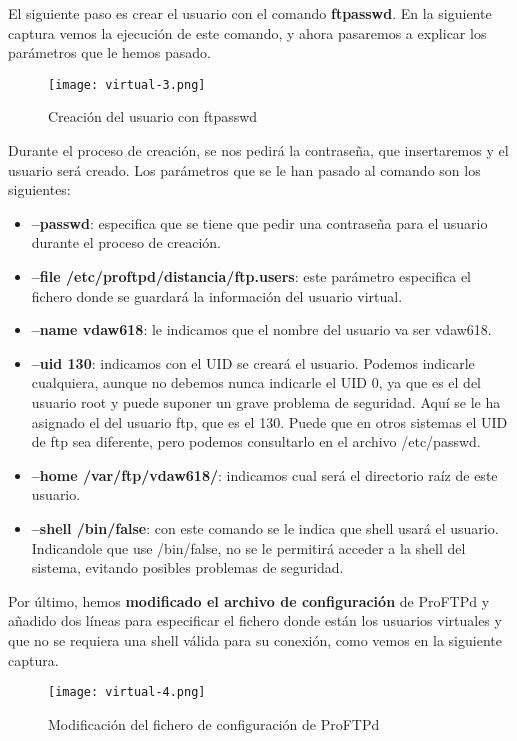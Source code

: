 El siguiente paso es crear el usuario con el comando \textbf{ftpasswd}. En la siguiente captura vemos la ejecución de este comando, y ahora pasaremos a explicar los parámetros que le hemos pasado.

\begin{figure}[H]
    \centering
    \texttt{[image: virtual-3.png]}
    \caption{Creación del usuario con ftpasswd}
\end{figure}

Durante el proceso de creación, se nos pedirá la contraseña, que insertaremos y el usuario será creado. Los parámetros que se le han pasado al comando son los siguientes:

\begin{itemize}
    \item \textbf{--passwd}: especifica que se tiene que pedir una contraseña para el usuario durante el proceso de creación.
    \item \textbf{--file /etc/proftpd/distancia/ftp.users}: este parámetro especifica el fichero donde se guardará la información del usuario virtual.
    \item \textbf{--name vdaw618}: le indicamos que el nombre del usuario va ser vdaw618.
    \item \textbf{--uid 130}: indicamos con el UID se creará el usuario. Podemos indicarle cualquiera, aunque no debemos nunca indicarle el UID 0, ya que es el del usuario root y puede suponer un grave problema de seguridad. Aquí se le ha asignado el del usuario ftp, que es el 130. Puede que en otros sistemas el UID de ftp sea diferente, pero podemos consultarlo en el archivo /etc/passwd.
    \item \textbf{--home /var/ftp/vdaw618/}: indicamos cual será el directorio raíz de este usuario.
    \item \textbf{--shell /bin/false}: con este comando se le indica que shell usará el usuario. Indicandole que use /bin/false, no se le permitirá acceder a la shell del sistema, evitando posibles problemas de seguridad.
\end{itemize}

Por último, hemos \textbf{modificado el archivo de configuración} de ProFTPd y añadido dos líneas para especificar el fichero donde están los usuarios virtuales y que no se requiera una shell válida para su conexión, como vemos en la siguiente captura.

\begin{figure}[H]
    \centering
    \texttt{[image: virtual-4.png]}
    \caption{Modificación del fichero de configuración de ProFTPd}
\end{figure}


